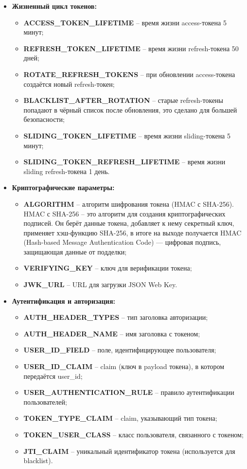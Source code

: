 \documentclass[a4paper,14pt]{extarticle}
\begin{document}
	\begin{itemize}
		\item \textbf{Жизненный цикл токенов:}
		\begin{itemize}
			\item \textbf{ACCESS\_TOKEN\_LIFETIME} -- время жизни access-токена 5 минут;
			\item \textbf{REFRESH\_TOKEN\_LIFETIME} -- время жизни refresh-токена 50 дней;
			\item \textbf{ROTATE\_REFRESH\_TOKENS} -- при обновлении access-токена создаётся новый refresh-токен;
			\item \textbf{BLACKLIST\_AFTER\_ROTATION} -- старые refresh-токены попадают в чёрный список после обновления, это сделано для большей безопасности;
			\item \textbf{SLIDING\_TOKEN\_LIFETIME} -- время жизни sliding-токена 5 минут;
			\item \textbf{SLIDING\_TOKEN\_REFRESH\_LIFETIME} -- время жизни sliding refresh-токена 1 день.
		\end{itemize}
		
		\item \textbf{Криптографические параметры:}
		\begin{itemize}
			\item \textbf{ALGORITHM} -- алгоритм шифрования токена (HMAC с SHA-256). HMAC с SHA-256 -- это алгоритм для создания криптографических подписей. Он берёт данные токена, добавляет к нему секретный ключ, применяет хэш-функцию SHA-256, в итоге на выходе получается HMAC (Hash-based Message Authentication Code) — цифровая подпись, защищающая данные от подделки;
			\item \textbf{VERIFYING\_KEY} -- ключ для верификации токена;
			\item \textbf{JWK\_URL} -- URL для загрузки JSON Web Key.
		\end{itemize}
		
		\item \textbf{Аутентификация и авторизация:}
		\begin{itemize}
			\item \textbf{AUTH\_HEADER\_TYPES} -- тип заголовка авторизации;
			\item \textbf{AUTH\_HEADER\_NAME} -- имя заголовка с токеном;
			\item \textbf{USER\_ID\_FIELD} -- поле, идентифицирующее пользователя;
			\item \textbf{USER\_ID\_CLAIM} -- claim (ключ в payload токена), в котором передаётся user\_id;
			\item \textbf{USER\_AUTHENTICATION\_RULE} -- правило аутентификации пользователей;
			\item \textbf{TOKEN\_TYPE\_CLAIM} -- claim, указывающий тип токена;
			\item \textbf{TOKEN\_USER\_CLASS} -- класс пользователя, связанного с токеном;
			\item \textbf{JTI\_CLAIM} -- уникальный идентификатор токена (используется для blacklist).
		\end{itemize}
		

\end{itemize}
\end{document}
